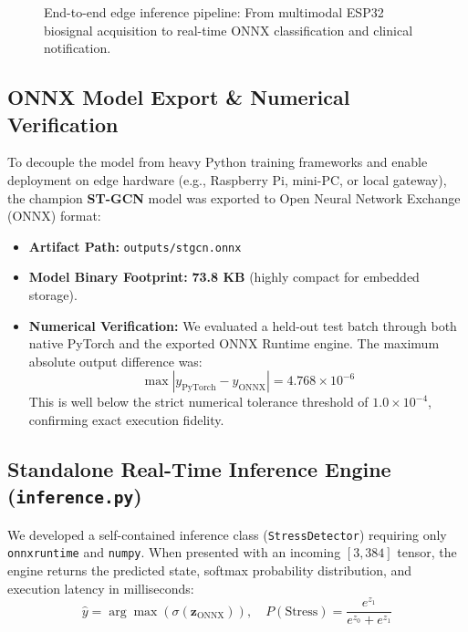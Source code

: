 \documentclass[conference]{IEEEtran}
\begin{document}
\begin{figure}[htbp]
{%
}
\caption{End-to-end edge inference pipeline: From multimodal ESP32 biosignal acquisition to real-time ONNX classification and clinical notification.}
\label{fig:system_arch}
\end{figure}

\subsection{ONNX Model Export \& Numerical Verification}
To decouple the model from heavy Python training frameworks and enable deployment on edge hardware (e.g., Raspberry Pi, mini-PC, or local gateway), the champion \textbf{ST-GCN} model was exported to Open Neural Network Exchange (ONNX) format:
\begin{itemize}
    \item \textbf{Artifact Path:} \texttt{outputs/stgcn.onnx}
    \item \textbf{Model Binary Footprint:} \textbf{73.8 KB} (highly compact for embedded storage).
    \item \textbf{Numerical Verification:} We evaluated a held-out test batch through both native PyTorch and the exported ONNX Runtime engine. The maximum absolute output difference was:
    \begin{equation}
    \max |y_{\text{PyTorch}} - y_{\text{ONNX}}| = 4.768 \times 10^{-6}
    \end{equation}
    This is well below the strict numerical tolerance threshold of $1.0 \times 10^{-4}$, confirming exact execution fidelity.
\end{itemize}

\subsection{Standalone Real-Time Inference Engine (\texttt{inference.py})}
We developed a self-contained inference class (\texttt{StressDetector}) requiring only \texttt{onnxruntime} and \texttt{numpy}. When presented with an incoming $[3, 384]$ tensor, the engine returns the predicted state, softmax probability distribution, and execution latency in milliseconds:
\begin{equation}
\hat{y} = \arg\max \left( \sigma(\mathbf{z}_{\text{ONNX}}) \right), \quad P(\text{Stress}) = \frac{e^{z_1}}{e^{z_0} + e^{z_1}}
\end{equation}
\end{document}
